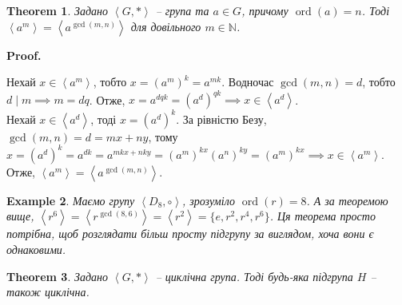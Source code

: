 \documentclass[a4paper, 10pt]{article}
\makeatletter
\theoremstyle{theoremdd}
\newtheorem{theorem}{Theorem}[subsection]
\theoremstyle{theoremdd}
\theoremstyle{theoremdd}
\theoremstyle{theoremdd}
\theoremstyle{theoremdd}
\newtheorem{example}[theorem]{Example}
\theoremstyle{theoremdd}
\theoremstyle{theoremdd}
\theoremstyle{theoremdd}
\theoremstyle{theoremdd}
\theoremstyle{theoremdd}
\theoremstyle{theoremdd}
\theoremstyle{theoremdd}
\theoremstyle{theoremdd}
\theoremstyle{theoremdd}
\theoremstyle{theoremdd}
\renewenvironment{proof}[1][Proof.\\]{\par
\pushQED{\hfill \qed}%
\normalfont \topsep6\p@\@plus6\p@\relax
\trivlist
\item\relax
{\bfseries
#1\@addpunct{.}}\hspace\labelsep\ignorespaces
}{%
\popQED\endtrivlist\@endpefalse
}
\DeclareMathOperator{\ord}{ord}
\makeatother
\begin{document}
\begin{theorem}
Задано $\left<G, *\right>$ -- група та $a \in G$, причому $\ord (a) = n$. Тоді $\left<a^m\right> = \left<a^{\gcd(m,n)}\right>$ для довільного $m \in \mathbb{N}$.
\end{theorem}

\begin{proof}
Нехай $x \in \left<a^m\right>$, тобто $x = (a^m)^k = a^{mk}$. Водночас $\gcd(m,n) = d$, тобто $d \mid m \implies m = dq$. Отже, $x = a^{dqk} = (a^d)^{qk} \implies x \in \left<a^{d}\right>$.
\bigskip \\
Нехай $x \in \left<a^d\right>$, тоді $x = (a^d)^k$. За рівністю Безу, $\gcd(m,n) = d = mx + ny$, тому $x= (a^d)^k = a^{dk} = a^{mkx + nky} = (a^{m})^{kx} (a^{n})^{ky} = (a^m)^{kx} \implies x \in \left<a^m\right>$.\\
Отже, $\left<a^m\right> = \left<a^{\gcd(m,n)}\right>$.
\end{proof}

\begin{example}
Маємо групу $\left< D_{8}, \circ \right>$, зрозуміло $\ord (r) = 8$. А за теоремою вище, $\left<r^6\right> = \left<r^{\gcd(8,6)}\right> = \left<r^2\right> = \{e,r^2,r^4,r^6\}$. Ця теорема просто потрібна, щоб розглядати більш просту підгрупу за виглядом, хоча вони є однаковими.
\end{example}

\begin{theorem}
Задано $\left< G, *\right>$ -- циклічна група. Тоді будь-яка підгрупа $H$ -- також циклічна.
\end{theorem}
\end{document}

